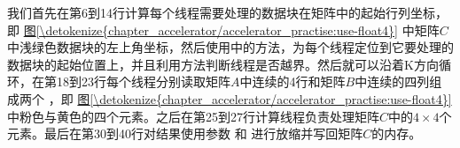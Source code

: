 \documentclass[letterpaper,10pt,english]{sphinxmanual}
\begin{document}
\begin{sphinxVerbatim}[commandchars=\\\{\}]
 

\PYG{p}{[}\PYG{p}{]}
\PYG{p}{[}\PYG{p}{]}
\end{sphinxVerbatim}

\sphinxAtStartPar
我们首先在第6到14行计算每个线程需要处理的数据块在矩阵中的起始行列坐标，即
\hyperref[\detokenize{chapter_accelerator/accelerator_practise:use-float4}]{图\ref{\detokenize{chapter_accelerator/accelerator_practise:use-float4}}}
中矩阵\(C\)中浅绿色数据块的左上角坐标，然后使用中的方法，为每个线程定位到它要处理的数据块的起始位置上，并且利用方法判断线程是否越界。然后就可以沿着K方向循环，在第18到23行每个线程分别读取矩阵\(A\)中连续的4行和矩阵\(B\)中连续的四列组成两个
 ，即 \hyperref[\detokenize{chapter_accelerator/accelerator_practise:use-float4}]{图\ref{\detokenize{chapter_accelerator/accelerator_practise:use-float4}}}
中粉色与黄色的四个元素。之后在第25到27行计算线程负责处理矩阵\(C\)中的\(4 \times 4\)个元素。最后在第30到40行对结果使用参数
 和  进行放缩并写回矩阵\(C\)的内存。
\end{document}
